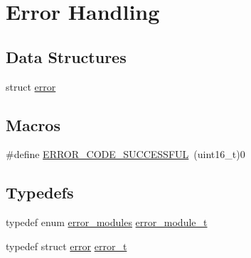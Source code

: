 \hypertarget{group__error}{}\section{Error Handling}
\label{group__error}
\subsection*{Data Structures}
\begin{DoxyCompactItemize}
\item 
struct \mbox{\hyperlink{structerror}{error}}
\end{DoxyCompactItemize}
\subsection*{Macros}
\begin{DoxyCompactItemize}
\item 
\#define \mbox{\hyperlink{group__error_gacdd581bef905616f588f5be6b5a5bae3}{E\+R\+R\+O\+R\+\_\+\+C\+O\+D\+E\+\_\+\+S\+U\+C\+C\+E\+S\+S\+F\+UL}}~(uint16\+\_\+t)0
\end{DoxyCompactItemize}
\subsection*{Typedefs}
\begin{DoxyCompactItemize}
\item 
typedef enum \mbox{\hyperlink{group__error_ga8a4a6940eb9ce245840c7e0af23a8b7c}{error\+\_\+modules}} \mbox{\hyperlink{group__error_ga07aaf66e281b4d8635efe00e6402f4a3}{error\+\_\+module\+\_\+t}}
\item 
typedef struct \mbox{\hyperlink{structerror}{error}} \mbox{\hyperlink{group__error_gad3ae44be85fe6952dcaed425499e8f6b}{error\+\_\+t}}
\end{DoxyCompactItemize}
